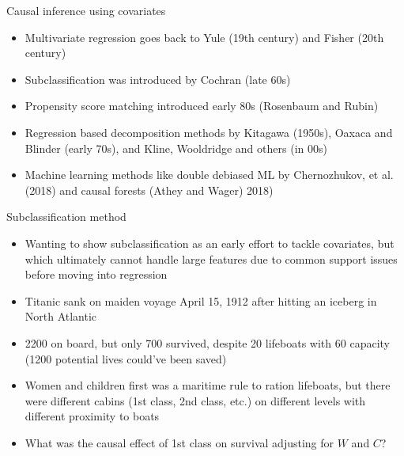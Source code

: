 \documentclass{beamer}
\begin{document}
\begin{frame}{Causal inference using covariates}
\begin{itemize}

\item Multivariate regression goes back to Yule (19th century) and Fisher (20th century)
\item Subclassification was introduced by Cochran (late 60s)
\item Propensity score matching introduced early 80s (Rosenbaum and Rubin)
\item Regression based decomposition methods by Kitagawa (1950s), Oaxaca and Blinder (early 70s), and Kline, Wooldridge and others (in 00s)
\item Machine learning methods like double debiased ML by Chernozhukov, et al. (2018) and causal forests (Athey and Wager) 2018)
\end{itemize}

\end{frame}


\begin{frame}{Subclassification method}

\begin{itemize}

\item Wanting to show subclassification as an early effort to tackle covariates, but which ultimately cannot handle large features due to common support issues before moving into regression 
\item Titanic sank on maiden voyage April 15, 1912 after hitting an iceberg in North Atlantic
\item 2200 on board, but only 700 survived, despite 20 lifeboats with 60 capacity (1200 potential lives could've been saved)
\item Women and children first was a maritime rule to ration lifeboats, but there were different cabins (1st class, 2nd class, etc.) on different levels with different proximity to boats
\item What was the causal effect of 1st class on survival adjusting for $W$ and $C$?
\end{itemize}

\end{frame}
\end{document}
